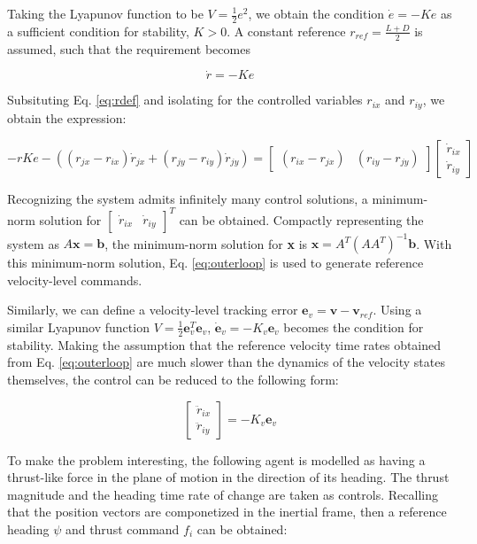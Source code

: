 \documentclass{aiaa-tc}
\newcommand{\B}[1]{\textbf{#1}} %
\begin{document}
Taking the Lyapunov function to be $V = \frac{1}{2} e^2$, we obtain the condition $\dot{e} = -Ke$ as a sufficient condition for stability, $K > 0$. A constant reference $r_{ref} = \frac{L+D}{2}$ is assumed, such that the requirement becomes

\begin{equation}
\dot{r} = -Ke
\end{equation}

Subsituting Eq. \ref{eq:rdef} and isolating for the controlled variables $r_{ix}$ and $r_{iy}$, we obtain the expression:

\begin{equation}
-rKe - ((r_{jx}-r_{ix})\dot{r}_{jx} + (r_{jy} - r_{iy})\dot{r}_{jy}) = \begin{bmatrix}
(r_{ix}-r_{jx}) & (r_{iy}-r_{jy})
\end{bmatrix}
\begin{bmatrix}
\dot{r}_{ix} \\
\dot{r}_{iy}
\end{bmatrix}
\label{eq:outerloop}
\end{equation}

Recognizing the system admits infinitely many control solutions, a minimum-norm solution for $\begin{bmatrix}
\dot{r}_{ix} &
\dot{r}_{iy}
\end{bmatrix}^T$ can be obtained. Compactly representing the system as $A\B{x} = \B{b}$, the minimum-norm solution for \B{x} is $\B{x} = A^T(AA^T)^{-1}\B{b}$. With this minimum-norm solution, Eq. \ref{eq:outerloop} is used to generate reference velocity-level commands.

Similarly, we can define a velocity-level tracking error $\B{e}_v = \B{v} - \B{v}_{ref}$. Using a similar Lyapunov function $V = \frac{1}{2} \B{e}_v^T \B{e}_v$, $\dot{\B{e}}_v = -K_v \B{e}_v$ becomes the condition for stability. Making the assumption that the reference velocity time rates obtained from Eq. \ref{eq:outerloop} are much slower than the dynamics of the velocity states themselves, the control can be reduced to the following form:

\begin{equation}
\begin{bmatrix}
\ddot{r}_{ix} \\
\ddot{r}_{iy}
\end{bmatrix} = -K_v \B{e}_v
\end{equation}

To make the problem interesting, the following agent is modelled as having a thrust-like force in the plane of motion in the direction of its heading. The thrust magnitude and the heading time rate of change are taken as controls. Recalling that the position vectors are componetized in the inertial frame, then a reference heading $\psi$ and thrust command $f_i$ can be obtained:
\end{document}
